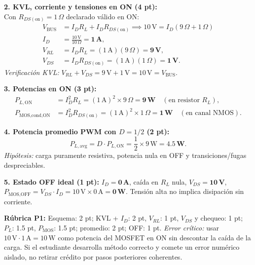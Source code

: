\documentclass[11pt, a4paper]{article}
\begin{document}
\begin{minipage}[t]{0.55\linewidth}
\textbf{2. KVL, corriente y tensiones en ON (4 pt):}\\
Con $R_{DS(\text{on})} = 1\,\Omega$ declarado válido en ON:
\begin{align*}
    V_{\text{BUS}} &= I_D R_L + I_D R_{DS(\text{on})} \implies 10\,\text{V} = I_D(9\,\Omega + 1\,\Omega) \\
    I_D &= \frac{10\,\text{V}}{10\,\Omega} = \mathbf{1\,\text{A}}, \\
    V_{RL} &= I_D R_L = (1\,\text{A})(9\,\Omega) = \mathbf{9\,\text{V}}, \\
    V_{DS} &= I_D R_{DS(\text{on})} = (1\,\text{A})(1\,\Omega) = \mathbf{1\,\text{V}}.
\end{align*}
\textit{Verificación KVL:} $V_{RL} + V_{DS} = 9\,\text{V} + 1\,\text{V} = 10\,\text{V} = V_{\text{BUS}}$.

\vspace{0.15cm}
\textbf{3. Potencias en ON (3 pt):}
\begin{align*}
    P_{L,\text{ON}} &= I_D^2 R_L = (1\,\text{A})^2 \times 9\,\Omega = \mathbf{9\,\text{W}} \quad (\text{en resistor } R_L), \\
    P_{\text{MOS,cond,ON}} &= I_D^2 R_{DS(\text{on})} = (1\,\text{A})^2 \times 1\,\Omega = \mathbf{1\,\text{W}} \quad (\text{en canal NMOS}).
\end{align*}

\textbf{4. Potencia promedio PWM con $D = 1/2$ (2 pt):}
\[
    P_{L,\text{avg}} = D \cdot P_{L,\text{ON}} = \frac{1}{2} \times 9\,\text{W} = \mathbf{4.5\,\text{W}}.
\]
\textit{Hipótesis:} carga puramente resistiva, potencia nula en OFF y transiciones/fugas despreciables.

\vspace{0.1cm}
\textbf{5. Estado OFF ideal (1 pt):} $I_D = \mathbf{0\,\text{A}}$, caída en $R_L$ nula, $V_{DS} = \mathbf{10\,\text{V}}$, $P_{\text{MOS,OFF}} = V_{DS}\cdot I_D = 10\,\text{V}\times 0\,\text{A} = \mathbf{0\,\text{W}}$. Tensión alta no implica disipación sin corriente.
\end{minipage}

\vspace{0.15cm}
\noindent\textbf{Rúbrica P1:} Esquema: 2 pt; KVL + $I_D$: 2 pt, $V_{RL}$: 1 pt, $V_{DS}$ y chequeo: 1 pt; $P_L$: 1.5 pt, $P_{\text{MOS}}$: 1.5 pt; promedio: 2 pt; OFF: 1 pt. \textit{Error crítico:} usar $10\,\text{V}\cdot 1\,\text{A} = 10\,\text{W}$ como potencia del MOSFET en ON sin descontar la caída de la carga. Si el estudiante desarrolla método correcto y comete un error numérico aislado, no retirar crédito por pasos posteriores coherentes.
\end{document}
